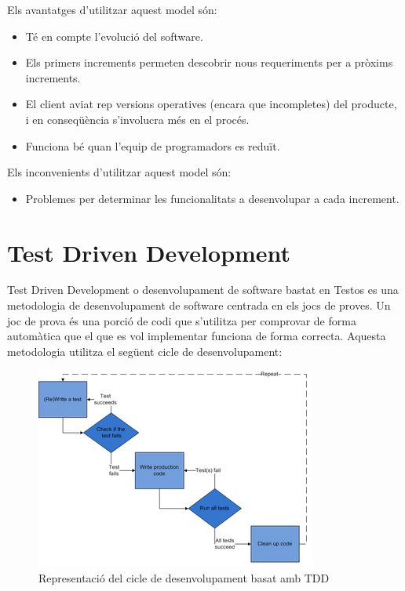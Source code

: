 Els avantatges d’utilitzar aquest model són:

\begin{itemize}
\item{Té en compte l’evolució del software.}
\item{Els primers increments permeten descobrir nous requeriments per a pròxims increments.}
\item{El client aviat rep versions operatives (encara que incompletes) del producte, i en conseqüència s’involucra més en el procés.}
\item{Funciona bé quan l’equip de programadors es reduït.}
\end{itemize}

Els inconvenients d’utilitzar aquest model són:

\begin{itemize}
\item{Problemes per determinar les funcionalitats a desenvolupar a cada increment.}
\end{itemize}

\section{Test Driven Development}
\label{sec:tdd}

Test Driven Development o desenvolupament de software bastat en Testos es una metodologia de desenvolupament de software centrada en els jocs de proves. Un joc de prova és una porció de codi que s'utilitza per comprovar de forma automàtica que el que es vol implementar funciona de forma correcta. Aquesta metodologia utilitza el següent cicle de desenvolupament: 

\begin{figure}[htbp]
\centering\includegraphics{img/test-driven-development.png}
\caption{Representació del cicle de desenvolupament basat amb TDD}
\label{fig:tdd}
\end{figure} 

